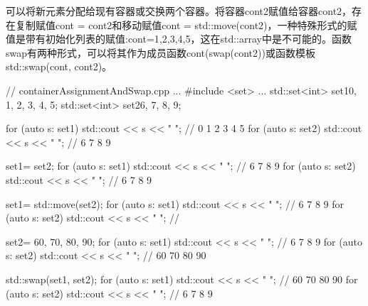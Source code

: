 可以将新元素分配给现有容器或交换两个容器。将容器cont2赋值给容器cont2，存在复制赋值cont = cont2和移动赋值cont = std::move(cont2)，一种特殊形式的赋值是带有初始化列表的赋值:cont={1,2,3,4,5}，这在std::array中是不可能的。函数swap有两种形式，可以将其作为成员函数cont(swap(cont2))或函数模板std::swap(cont, cont2)。


\begin{cpp}
// containerAssignmentAndSwap.cpp
...
#include <set>
...
std::set<int> set1{0, 1, 2, 3, 4, 5};
std::set<int> set2{6, 7, 8, 9};

for (auto s: set1) std::cout << s << " "; // 0 1 2 3 4 5
for (auto s: set2) std::cout << s << " "; // 6 7 8 9

set1= set2;
for (auto s: set1) std::cout << s << " "; // 6 7 8 9
for (auto s: set2) std::cout << s << " "; // 6 7 8 9

set1= std::move(set2);
for (auto s: set1) std::cout << s << " "; // 6 7 8 9
for (auto s: set2) std::cout << s << " "; //

set2= {60, 70, 80, 90};
for (auto s: set1) std::cout << s << " "; // 6 7 8 9
for (auto s: set2) std::cout << s << " "; // 60 70 80 90

std::swap(set1, set2);
for (auto s: set1) std::cout << s << " "; // 60 70 80 90
for (auto s: set2) std::cout << s << " "; // 6 7 8 9
\end{cpp}